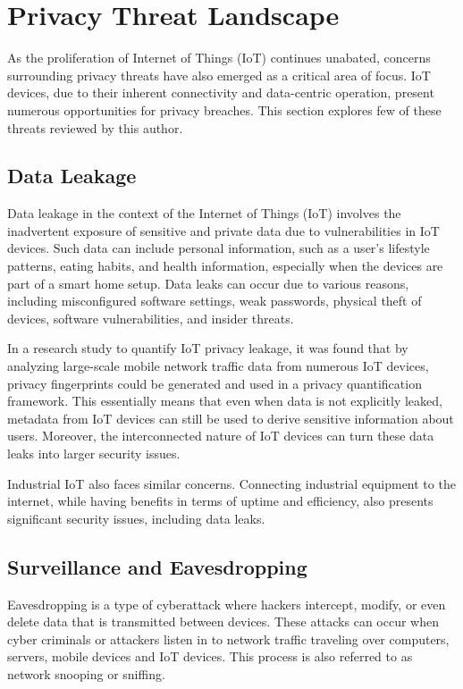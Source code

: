 
\section{Privacy Threat Landscape}
\label{sec:privacy_threat_landscape}
As the proliferation of Internet of Things (IoT) continues unabated, concerns surrounding privacy threats have also emerged as a critical area of focus. IoT devices, due to their inherent connectivity and data-centric operation, present numerous opportunities for privacy breaches. This section explores few of these threats reviewed by this author.

\subsection{Data Leakage}
Data leakage in the context of the Internet of Things (IoT) involves the inadvertent exposure of sensitive and private data due to vulnerabilities in IoT devices. Such data can include personal information, such as a user's lifestyle patterns, eating habits, and health information, especially when the devices are part of a smart home setup\cite{park2019security}. Data leaks can occur due to various reasons, including misconfigured software settings, weak passwords, physical theft of devices, software vulnerabilities, and insider threats.

In a research study to quantify IoT privacy leakage, it was found that by analyzing large-scale mobile network traffic data from numerous IoT devices, privacy fingerprints could be generated and used in a privacy quantification framework\cite{hui2020systematically}. This essentially means that even when data is not explicitly leaked, metadata from IoT devices can still be used to derive sensitive information about users. Moreover, the interconnected nature of IoT devices can turn these data leaks into larger security issues.

Industrial IoT also faces similar concerns. Connecting industrial equipment to the internet, while having benefits in terms of uptime and efficiency, also presents significant security issues, including data leaks\cite{semiengineering2023}.

\subsection{Surveillance and Eavesdropping}
Eavesdropping is a type of cyberattack where hackers intercept, modify, or even delete data that is transmitted between devices. These attacks can occur when cyber criminals or attackers listen in to network traffic traveling over computers, servers, mobile devices and IoT devices. This process is also referred to as network snooping or sniffing.

